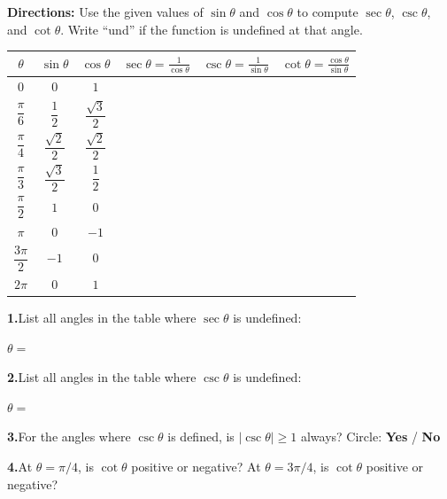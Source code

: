 \documentclass[10pt]{article}
\begin{document}
\begin{tcolorbox}[colback=white, colframe=black!40,
    title=\textbf{Tier R --- Reinforce},
    fonttitle=\bfseries, arc=2mm, left=3mm, right=3mm, top=2mm, bottom=2mm]

\textbf{Directions:} Use the given values of $\sin\theta$ and $\cos\theta$ to
compute $\sec\theta$, $\csc\theta$, and $\cot\theta$. Write ``und'' if the
function is undefined at that angle.

\vspace{4pt}
\renewcommand{\arraystretch}{1.7}
\begin{tabular}{|c|c|c|c|c|c|}
\hline
$\theta$ & $\sin\theta$ & $\cos\theta$ & $\sec\theta = \frac{1}{\cos\theta}$ & $\csc\theta = \frac{1}{\sin\theta}$ & $\cot\theta = \frac{\cos\theta}{\sin\theta}$ \\
\hline
$0$ & $0$ & $1$ & & & \\
\hline
$\dfrac{\pi}{6}$ & $\dfrac{1}{2}$ & $\dfrac{\sqrt{3}}{2}$ & & & \\
\hline
$\dfrac{\pi}{4}$ & $\dfrac{\sqrt{2}}{2}$ & $\dfrac{\sqrt{2}}{2}$ & & & \\
\hline
$\dfrac{\pi}{3}$ & $\dfrac{\sqrt{3}}{2}$ & $\dfrac{1}{2}$ & & & \\
\hline
$\dfrac{\pi}{2}$ & $1$ & $0$ & & & \\
\hline
$\pi$ & $0$ & $-1$ & & & \\
\hline
$\dfrac{3\pi}{2}$ & $-1$ & $0$ & & & \\
\hline
$2\pi$ & $0$ & $1$ & & & \\
\hline
\end{tabular}

\vspace{8pt}
\textbf{1.}\quad List all angles in the table where $\sec\theta$ is undefined:

\vspace{4pt}
$\theta = $ \underline{\hspace{5cm}}

\vspace{6pt}
\textbf{2.}\quad List all angles in the table where $\csc\theta$ is undefined:

\vspace{4pt}
$\theta = $ \underline{\hspace{5cm}}

\vspace{6pt}
\textbf{3.}\quad For the angles where $\csc\theta$ is defined, is $|\csc\theta| \geq 1$
always? Circle: \quad \textbf{Yes} \quad / \quad \textbf{No}

\vspace{6pt}
\textbf{4.}\quad At $\theta = \pi/4$, is $\cot\theta$ positive or negative?
\underline{\hspace{2cm}}
At $\theta = 3\pi/4$, is $\cot\theta$ positive or negative?
\underline{\hspace{2cm}}

\end{tcolorbox}
\end{document}
